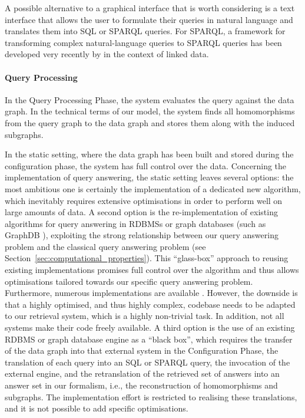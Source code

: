 A possible alternative to a graphical interface that is worth considering
is a text interface that allows the user to formulate their queries in natural language
and translates them into SQL or SPARQL queries.
For SPARQL, a framework for transforming complex natural-language queries 
to SPARQL queries has been developed very recently by \textcite{Boumechaal2023}
in the context of linked data.

\paragraph{Query Processing}

In the Query Processing Phase, the system evaluates the query against the
data graph.
In the technical terms of our model, the system finds all homomorphisms from the query graph
to the data graph and stores them along with the induced subgraphs.

In the static setting, where the data graph has been built and stored during the
configuration phase, the system has full control over the data.
Concerning the implementation of query answering,
the static setting leaves several options:
the most ambitious one is certainly the implementation of a dedicated new
algorithm, which inevitably requires extensive optimisations in order to perform
well on large amounts of data.
A second option is the re-implementation of existing algorithms
for query answering in \glspl{RDBMS} or graph databases (such as GraphDB \autocite{GraphDB}),
exploiting the strong relationship
between our query answering problem and the classical query answering problem
(see Section~\ref{sec:computational_properties}).
This \enquote{glass-box} approach to reusing existing implementations promises
full control over the algorithm and thus allows optimisations tailored
towards our specific query answering problem.
Furthermore, numerous implementations are available \autocite[cf.][]{WikiSQLRDBMSs}.
However, the downside is that a highly optimised, and thus highly complex,
codebase needs to be adapted to our retrieval system, which is a
highly non-trivial task. In addition, not all systems make their code freely available.
A third option is the use of an existing \gls{RDBMS} or graph database engine
as a \enquote{black box},
which requires the transfer of the data graph into that external system in the Configuration Phase,
the translation of each query into an \gls{SQL} or \gls{SPARQL} query,
the invocation of the external engine,
and the retranslation of the retrieved set of answers
into an answer set in our formalism, i.e.,
the reconstruction of homomorphisms and subgraphs.
The implementation effort is restricted to realising these translations,
and it is not possible to add specific optimisations.

